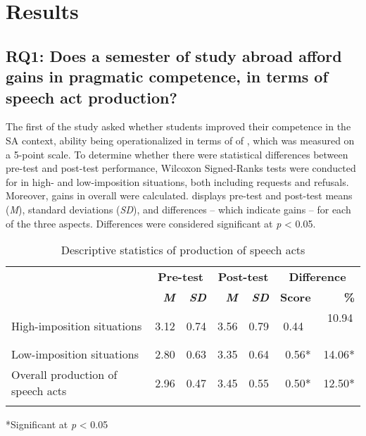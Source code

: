 \documentclass[output=paper]{langsci/langscibook}
\begin{document}
\section{Results}
\largerpage

\subsection{RQ1: Does a semester of study abroad afford gains in pragmatic competence, in terms of speech act production?}

The first  of the study asked whether students improved their  competence in the SA context,  ability being operationalized in terms of  of , which was measured on a 5-point scale. To determine whether there were statistical differences between pre-test and post-test  performance, Wilcoxon Signed-Ranks tests were conducted for  in high- and low-imposition situations, both including requests and refusals. Moreover, gains in overall  were calculated.  displays pre-test and post-test means (\textit{M}), standard deviations (\textit{SD}), and differences – which indicate gains – for each of the three aspects. Differences were considered significant at \textit{p} < 0.05.


\begin{table}
\caption{Descriptive statistics of production of speech acts}
\label{tab:sanchez:4}
\begin{tabularx}{\textwidth}{lrrrrrr}
\lsptoprule
& \multicolumn{2}{c}{\bfseries Pre-test} & \multicolumn{2}{c}{\bfseries Post-test} & \multicolumn{2}{c}{\bfseries Difference}\\
& \bfseries \textit{M} & \bfseries \textit{SD} & \bfseries \textit{M} & \bfseries \textit{SD} & \bfseries Score & \bfseries \%\\
\midrule
High-imposition situations & 3.12 & 0.74 & 3.56 & 0.79 & 0.44\,~ & 10.94\,~ \\
Low-imposition situations & 2.80 & 0.63 & 3.35 & 0.64 &  0.56* &  14.06*\\
\midrule
Overall production of speech acts & 2.96 & 0.47 & 3.45 & 0.55 &  0.50* &  12.50*\\
\lspbottomrule
\end{tabularx}
\footnotesize
*Significant at \textit{p} < 0.05
\end{table}
\end{document}
